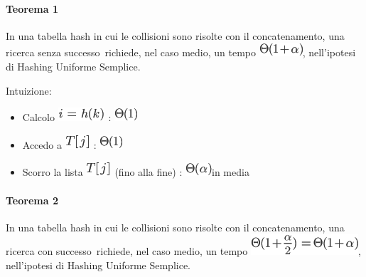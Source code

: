 \documentclass{article}
\providecommand{\tightlist}{%
  \setlength{\itemsep}{0pt}\setlength{\parskip}{0pt}}
\let\oldparagraph\paragraph
\renewcommand{\paragraph}[1]{\oldparagraph{#1}\mbox{}}
\begin{document}
{}

\hypertarget{h.coagge9vpuqt}{\paragraph{\texorpdfstring{{Teorema
1}}{Teorema 1}}\label{h.coagge9vpuqt}}

{In una tabella hash in cui le collisioni sono risolte con il
concatenamento, una }{ricerca senza successo}{~richiede, nel caso medio,
un tempo }\includegraphics{images/image247.png}{, nell'ipotesi di
Hashing Uniforme Semplice.}

{}

{Intuizione:}

\begin{itemize}
\tightlist
\item
  {Calcolo }\includegraphics{images/image248.png}{~:
  }\includegraphics{images/image69.png}
\item
  {Accedo a }\includegraphics{images/image244.png}{~:
  }\includegraphics{images/image69.png}
\item
  {Scorro la lista }\includegraphics{images/image244.png}{~(fino alla
  fine) : }\includegraphics{images/image249.png}{in media}
\end{itemize}

{}

\hypertarget{h.u0cyuvvucft2}{\paragraph{\texorpdfstring{{Teorema
2}}{Teorema 2}}\label{h.u0cyuvvucft2}}

{In una tabella hash in cui le collisioni sono risolte con il
concatenamento, una }{ricerca con successo}{~richiede, nel caso medio,
un tempo }\includegraphics{images/image250.png}{, nell'ipotesi di
Hashing Uniforme Semplice.}
\end{document}
